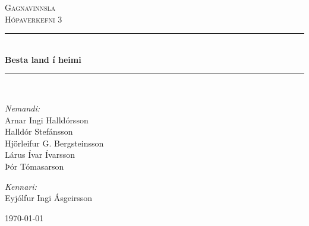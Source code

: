 \newcommand{\HRule}{\rule{\linewidth}{0.5mm}}

\begin{titlepage}

\begin{center}


\textsc{\LARGE Gagnavinnsla}\\[0.5cm]
\textsc{\Large Hópaverkefni 3}\\[0.6cm]

\HRule \\[0.4cm]
{ \Huge \bfseries Besta land í heimi}\\[0.2cm]

\HRule \\[1.5cm]


\begin{minipage}{0.49\textwidth}
\begin{flushleft} \large
\emph{Nemandi:}\\
Arnar Ingi Halldórsson\\
Halldór Stefánsson\\
Hjörleifur G. Bergsteinsson\\
Lárus Ívar Ívarsson\\
Þór Tómasarson
\end{flushleft}
\end{minipage}
\begin{minipage}{0.49\textwidth}
\begin{flushright} \large
\emph{Kennari:} \\
Eyjólfur Ingi Ásgeirsson
\end{flushright}
\end{minipage}

\vfill

{\large \today}



\end{center}

\end{titlepage}